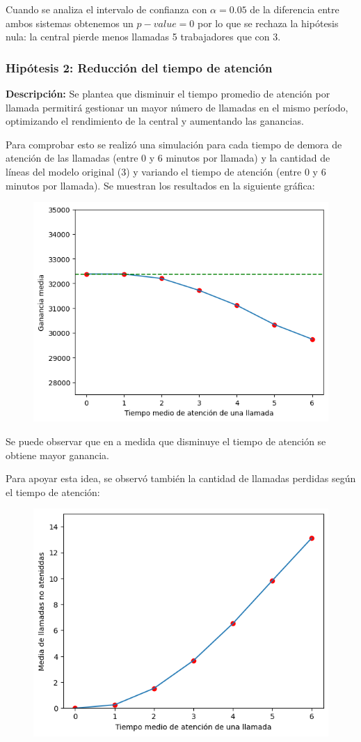 \documentclass{article}
\begin{document}
			Cuando se analiza el intervalo de confianza con $\alpha=0.05$ de la diferencia entre ambos sistemas obtenemos un $p-value = 0$ por lo que se rechaza la hipótesis nula: la central pierde menos llamadas 5 trabajadores que con 3.
			
			
			\subsubsection*{Hipótesis 2: Reducción del tiempo de atención}
			
			\textbf{Descripción:} Se plantea que disminuir el tiempo promedio de atención por llamada permitirá gestionar un mayor número de llamadas en el mismo período, optimizando el rendimiento de la central y aumentando las ganancias.
			\smallskip
				
			Para comprobar esto se realizó una simulación para cada tiempo de demora de atención de las llamadas (entre 0 y 6 minutos por llamada) y la cantidad de líneas del modelo original (3) y variando el tiempo de atención (entre 0 y 6 minutos por llamada). Se muestran los resultados en la siguiente gráfica:
			
			\begin{figure}[H]
				\centering
				\includegraphics[width=0.7\linewidth]{./output3.png}
				\label{fig:enter-label}
			\end{figure}
			
			Se puede observar que en a medida que disminuye el tiempo de atención se obtiene mayor ganancia.
			
			Para apoyar esta idea, se observó también la cantidad de llamadas perdidas según el tiempo de atención:
			
			\begin{figure}[H]
				\centering
				\includegraphics[width=0.7\linewidth]{./output2.png}
				\label{fig:enter-label}
			\end{figure}
			
\end{document}

